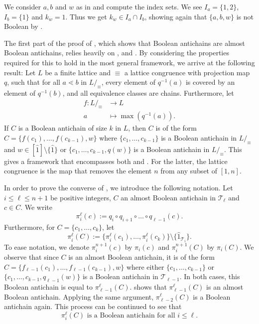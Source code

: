 \documentclass{preprint}
\newcommand{\cT}{\mathcal{T}}
\theoremstyle{definition}
\begin{document}
\begin{example}
    We consider $a, b$ and $w$ as in  and compute the index sets. We see $I_a= \{1,2\}$, $I_b=\{1\}$ and $k_w=1$. Thus we get $k_w \in I_a\cap I_b$, showing again that $\{a,b,w\}$ is not Boolean by .
\end{example}

\begin{remark}\label{rem: generalisation BooleanAreAlmostBoolean}
The first part of the proof of , which shows that Boolean antichains are almost Boolean antichains, relies heavily on ,  and . By considering the properties required for this to hold in the most general framework, we arrive at the following result:
Let $L$ be a finite lattice and $\equiv$ a lattice congruence with projection map $q$, such that for all $a \lessdot b$ in $L/_\equiv$, every element of $q^{-1}(a)$ is covered by an element of $q^{-1}(b)$, and all equivalence classes are chains. Furthermore, let
\begin{align*}
    f: L/_\equiv &\rightarrow L \\
    a &\mapsto \max(q^{-1}(a)).
\end{align*}
If $C$ is a Boolean antichain of size $k$ in $L$, then $C$ is of the form $C=\{f(c_1),\ldots,f(c_{k-1}),w\}$ where $\{c_1,\ldots,c_{k-1}\}$ is a Boolean antichain in $L/_\equiv$ and $w \in  [\hat{1}]\setminus\{\hat{1}\}$ or $\{c_1,\ldots,c_{k-1},q(w)\}$ is a Boolean antichain in $L/_\equiv$. 
This gives a framework that encompasses both  and . For the latter, the lattice congruence is the map that removes the element $n$ from any subset of $[1, n]$.
\end{remark}


In order to prove the converse of , we introduce the following notation. Let $i\leq\ell\leq n+1$ be positive integers, $C$ an almost Boolean antichain in $\cT_\ell$ and $c\in C$. We write
$$
    \pi_i^\ell(c):=q_i\circ q_{i+1}\circ \dots \circ q_{\ell-1}(c).
$$
Furthermore, for $C=\{c_1,\dots,c_k\}$, let
$$
    \pi_i^\ell(C):=\{\pi_i^\ell(c_1),\dots,\pi_i^\ell(c_k)\}\setminus \{\hat{1}_{\cT_i}\}.
$$
To ease notation, we denote $\pi_i^{n+1}(c)$ by $\pi_i(c)$ and $\pi_i^{n+1}(C)$ by $\pi_i(C)$. We observe that since $C$ is an almost Boolean antichain, it is of the form $C=\{f_{\ell-1}(c_1),\dots, f_{\ell-1}(c_{k-1}),w\}$ where either $\{c_1,\dots,c_{k-1}\}$ or $\{c_1,\dots, c_{k-1},q_{\ell-1}(w)\}$ is a Boolean antichain in $\cT_{\ell-1}$. In both cases, this Boolean antichain is equal to $\pi_{\ell-1}^\ell(C)$.  shows that $\pi_{\ell-1}^\ell(C)$ is an almost Boolean antichain. Applying the same argument, $\pi_{\ell-2}^\ell(C)$ is a Boolean antichain again. This process can be continued to see that 
\begin{equation}\label{eq: pi of C Boolean}
    \pi_i^\ell(C) \text{ is a Boolean antichain for all } i\leq \ell.
\end{equation}
\end{document}

